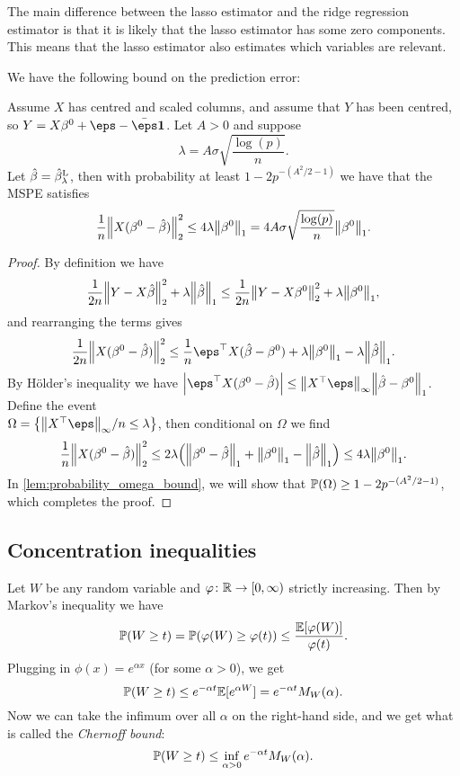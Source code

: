 The main difference between the lasso estimator and the ridge regression estimator is that it is likely that the lasso estimator has some zero components. This means that the lasso estimator also estimates which variables are relevant. 

We have the following bound on the prediction error:
\begin{theorem} \label{thm:lasso_slow_rate}
	Assume $X$ has centred and scaled columns, and assume that $Y$ has been centred, so $Y = X\beta^0 + \eps - \bar\eps \vec 1$. Let $A > 0$ and suppose
	\[
	\lambda = A\sigma\sqrt{\frac{\log(p)}{n}}.
	\]
	Let $\hat\beta = \hat\beta_\lambda^\mathrm{L}$, then with probability at least $1 - 2p^{-(A^2/2 - 1)}$ we have that the MSPE satisfies
	\[
	\frac1n \norm{X(\beta^0 - \hat\beta)}_2^2 \leq 4\lambda \norm{\beta^0}_1 = 4A\sigma\sqrt{\frac{\log(p)}{n}} \norm{\beta^0}_1. 
	\]
\end{theorem}

\begin{proof}
	By definition we have
	\[
	\frac1{2n}\norm{Y - X\hat\beta }_2^2 + \lambda \norm{\hat \beta}_1 \leq \frac1{2n}\norm{Y - X\beta^0}_2^2 + \lambda \norm{\beta^0}_1,
	\]
	and rearranging the terms gives
	\[
	\frac1{2n} \norm{X(\beta^0 - \hat\beta)}_2^2 \leq\frac1n \eps\T X (\hat\beta - \beta^0) + \lambda\norm{\beta^0}_1 - \lambda \norm{\hat\beta}_1. 
	\]
	By H\"older's inequality we have $\abs{\eps\T X(\beta^0 - \hat\beta)} \leq \norm{X\T\eps}_\infty \norm{\hat\beta - \beta^0}_1$. 
	Define the event \\ $\Omega = \qty{\norm{X\T\eps}_\infty/n \leq \lambda}$, then conditional on $\Omega$ we find
	\[
	\frac1{n} \norm{X(\beta^0 - \hat\beta)}_2^2 \leq 2\lambda \qty(\norm{\beta^0 - \hat\beta}_1 + \norm{\beta^0}_1 - \norm{\hat\beta}_1) \leq 4\lambda \norm{\beta^0}_1.
	\]
	In \cref{lem:probability_omega_bound}, we will show that $\mathbb P(\Omega) \geq 1 - 2p^{-(A^2/2 - 1)}$, which completes the proof. 
\end{proof}

\subsection{Concentration inequalities}
Let $W$ be any random variable and $\varphi \colon \mathbb R\to[0,\infty)$ strictly increasing. Then by Markov's inequality we have
\[
\mathbb P(W \geq t) = \mathbb P(\varphi(W) \geq \varphi(t)) \leq \frac{\mathbb E[\varphi(W)]}{\varphi(t)}. 
\]
Plugging in $\phi(x) = e^{\alpha x}$ (for some $\alpha > 0$), we get
\[
\mathbb P(W \geq t) \leq e^{-\alpha t} \mathbb E[e^{\alpha W}] = e^{-\alpha t} M_W(\alpha).
\]
Now we can take the infimum over all $\alpha$ on the right-hand side, and we get what is called the \emph{Chernoff bound}:
\[
\mathbb P(W \geq t) \leq \inf_{\alpha > 0} e^{-\alpha t} M_W(\alpha). 
\]

